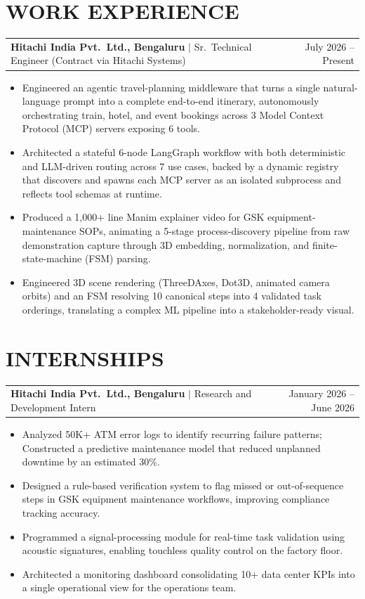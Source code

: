 \documentclass[11pt,letterpaper]{article}
\makeatletter
\newcommand{\entry}[3]{%
  \vspace{4pt}
  \noindent
  \begin{tabular*}{\textwidth}{@{}l@{\extracolsep{\fill}}r@{}}
    \textbf{#1} $|$ {\small #2} & {\small #3}
  \end{tabular*}%
  \vspace{-2pt}
}
\makeatother
\begin{document}
\section{WORK EXPERIENCE}

\entry{Hitachi India Pvt.\ Ltd., Bengaluru}{Sr.\ Technical Engineer (Contract via Hitachi Systems)}{July 2026 -- Present}
\begin{itemize}
  \item Engineered an agentic travel-planning middleware that turns a single natural-language prompt into a complete end-to-end itinerary, autonomously orchestrating train, hotel, and event bookings across 3 Model Context Protocol (MCP) servers exposing 6 tools.
  \item Architected a stateful 6-node LangGraph workflow with both deterministic and LLM-driven routing across 7 use cases, backed by a dynamic registry that discovers and spawns each MCP server as an isolated subprocess and reflects tool schemas at runtime.
  \item Produced a 1{,}000+ line Manim explainer video for GSK equipment-maintenance SOPs, animating a 5-stage process-discovery pipeline from raw demonstration capture through 3D embedding, normalization, and finite-state-machine (FSM) parsing.
  \item Engineered 3D scene rendering (ThreeDAxes, Dot3D, animated camera orbits) and an FSM resolving 10 canonical steps into 4 validated task orderings, translating a complex ML pipeline into a stakeholder-ready visual.
\end{itemize}

\section{INTERNSHIPS}

\entry{Hitachi India Pvt.\ Ltd., Bengaluru}{Research and Development Intern}{January 2026 -- June 2026}
\begin{itemize}
  \item Analyzed 50K+ ATM error logs to identify recurring failure patterns; Constructed a predictive maintenance model that reduced unplanned downtime by an estimated 30\%.
  \item Designed a rule-based verification system to flag missed or out-of-sequence steps in GSK equipment maintenance workflows, improving compliance tracking accuracy.
  \item Programmed a signal-processing module for real-time task validation using acoustic signatures, enabling touchless quality control on the factory floor.
  \item Architected a monitoring dashboard consolidating 10+ data center KPIs into a single operational view for the operations team.
\end{itemize}
\end{document}
